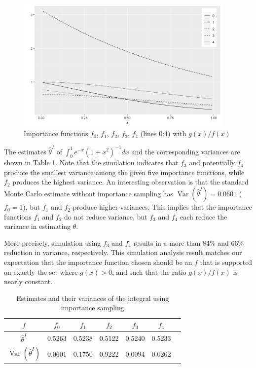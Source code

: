 \documentclass[11pt]{article}
\begin{document}
\begin{figure}[h!]
\includegraphics[width=0.95\textwidth]{2}
\centering
\caption{Importance functions $f_0$, $f_1$, $f_2$, $f_3$, $f_4$ (lines 0:4) with $g(x)/f(x)$}\label{fig:2}
\end{figure}

The estimates $\widehat{\theta}^I$ of $\int_0^1e^{-x}(1+x^2)^{-1}dx$ and the corresponding variances are shown in Table \ref{tab:1}. Note that the simulation indicates that $f_3$ and potentially $f_4$ produce the smallest variance among the given five importance functions, while $f_2$ produces the highest variance. An interesting observation is that the standard Monte Carlo estimate without importance sampling has $\operatorname{Var}\left(\widehat{\theta}^I\right)=0.0601$ ($f_0=1$), but $f_1$ and $f_2$ produce higher variances. This implies that the importance functions $f_1$ and $f_2$ do not reduce variance, but $f_3$ and $f_4$ each reduce the variance in estimating $\theta$.

More precisely, simulation using $f_3$ and $f_4$ results in a more than 84\% and 66\% reduction in variance, respectively. This simulation analysis result matches our expectation that the importance function chosen should be an $f$ that is supported on exactly the set where $g(x)>0$, and such that the ratio $g(x)/f(x)$ is nearly constant.

\begin{table}[h!]
\centering
\caption{Estimates and their variances of the integral using importance sampling}\label{tab:1}
\begin{tabular}{ccccccc}
\toprule
$f$ & $f_0$ & $f_1$ & $f_2$ & $f_3$ & $f_4$\\
\midrule
$\widehat{\theta}^I$ & 0.5263 & 0.5238 & 0.5122 & 0.5240 & 0.5233\\
$\operatorname{Var}\left(\widehat{\theta}^I\right)$ & 0.0601 & 0.1750 & 0.9222 & 0.0094 & 0.0202\\
\bottomrule
\end{tabular}
\end{table}
\end{document}
